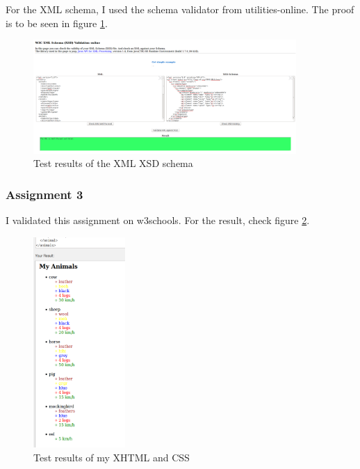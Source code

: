 For the XML schema, I used the schema validator from utilities-online. The proof is to be seen in figure \ref{fig:xmlxsdtest}.

\begin{figure}[H]
	\centering
	\includegraphics[width=100mm]{img/xmlxsdtest.png}
	\caption{Test results of the XML XSD schema}\label{fig:xmlxsdtest}
\end{figure}

\subsubsection{Assignment 3}
I validated this assignment on w3schools. For the result, check figure \ref{fig:xhtml}.

\begin{figure}[H]
	\centering
	\includegraphics[height=80mm]{img/xhtml.png}
	\caption{Test results of my XHTML and CSS}\label{fig:xhtml}
\end{figure}

